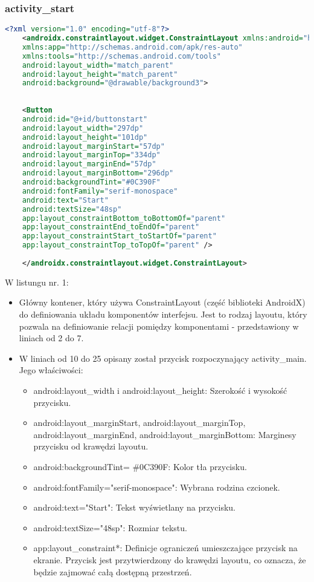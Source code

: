 \subsubsection{activity\_start}
\begin{lstlisting}[caption=Activity\_start, label={lst:kod.xml}, language=XML]
	<?xml version="1.0" encoding="utf-8"?>
	<androidx.constraintlayout.widget.ConstraintLayout xmlns:android="http://schemas.android.com/apk/res/android"
	xmlns:app="http://schemas.android.com/apk/res-auto"
	xmlns:tools="http://schemas.android.com/tools"
	android:layout_width="match_parent"
	android:layout_height="match_parent"
	android:background="@drawable/background3">
	
	
	<Button
	android:id="@+id/buttonstart"
	android:layout_width="297dp" 
	android:layout_height="101dp" 
	android:layout_marginStart="57dp"
	android:layout_marginTop="334dp"
	android:layout_marginEnd="57dp"
	android:layout_marginBottom="296dp"
	android:backgroundTint="#0C390F"
	android:fontFamily="serif-monospace"
	android:text="Start"
	android:textSize="48sp"
	app:layout_constraintBottom_toBottomOf="parent"
	app:layout_constraintEnd_toEndOf="parent"
	app:layout_constraintStart_toStartOf="parent"
	app:layout_constraintTop_toTopOf="parent" />
	
	</androidx.constraintlayout.widget.ConstraintLayout>
\end{lstlisting}
\newpage
\hspace{0.60cm}W listungu nr. 1:
\begin{itemize}
	\item Główny kontener, który używa ConstraintLayout (część biblioteki AndroidX) do definiowania układu komponentów interfejsu. Jest to rodzaj layoutu, który pozwala na definiowanie relacji pomiędzy komponentami - przedstawiony w liniach od 2 do 7.
	\item W liniach od 10 do 25 opisany został przycisk rozpoczynający activity\_main. Jego właściwości:
	\begin{itemize}
		\item android:layout\_width i android:layout\_height: Szerokość i wysokość przycisku.
		\item android:layout\_marginStart, android:layout\_marginTop, android:layout\_marginEnd, android:layout\_marginBottom: Marginesy przycisku od krawędzi layoutu.
		\item android:backgroundTint= \#0C390F: Kolor tła przycisku.
		\item android:fontFamily="serif-monospace": Wybrana rodzina czcionek.
		\item android:text="Start": Tekst wyświetlany na przycisku.
		\item android:textSize="48sp": Rozmiar tekstu.
		\item app:layout\_constraint*: Definicje ograniczeń umieszczające przycisk na ekranie. Przycisk jest przytwierdzony do krawędzi layoutu, co oznacza, że będzie zajmować całą dostępną przestrzeń.
	\end{itemize}
\end{itemize}
